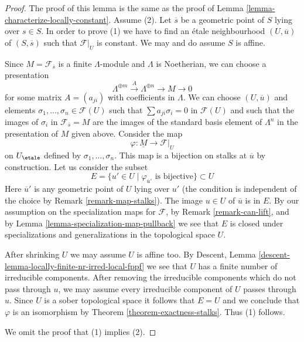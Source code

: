 \begin{proof}
The proof of this lemma is the same as the proof of
Lemma \ref{lemma-characterize-locally-constant}.
Assume (2). Let $\overline{s}$ be a geometric point of $S$ lying over
$s \in S$. In order to prove (1) we have to find an \'etale neighbourhood
$(U, \overline{u})$ of $(S, \overline{s})$ such that $\mathcal{F}|_U$
is constant. We may and do assume $S$ is affine.

\medskip\noindent
Since $M = \mathcal{F}_{\overline{s}}$ is a finite $\Lambda$-module
and $\Lambda$ is Noetherian, we can choose a presentation
$$
\Lambda^{\oplus m} \xrightarrow{A} \Lambda^{\oplus n} \to M \to 0
$$
for some matrix $A = (a_{ji})$ with coefficients in $\Lambda$.
We can choose $(U, \overline{u})$ and elements
$\sigma_1, \ldots, \sigma_n \in \mathcal{F}(U)$
such that $\sum a_{ji}\sigma_i = 0$ in $\mathcal{F}(U)$ and
such that the images of $\sigma_i$ in $\mathcal{F}_{\overline{s}} = M$
are the images of the standard basis element of
$\Lambda^n$ in the presentation of $M$ given above.
Consider the map
$$
\varphi : \underline{M} \longrightarrow \mathcal{F}|_U
$$
on $U_\etale$ defined by $\sigma_1, \ldots, \sigma_n$.
This map is a bijection on stalks at $\overline{u}$
by construction. Let us consider the subset
$$
E = \{u' \in U \mid \varphi_{\overline{u}'}\text{ is bijective}\} \subset U
$$
Here $\overline{u}'$ is any geometric point of $U$ lying over $u'$
(the condition is independent of the choice by Remark \ref{remark-map-stalks}).
The image $u \in U$ of $\overline{u}$ is in $E$.
By our assumption on the specialization maps for $\mathcal{F}$,
by Remark \ref{remark-can-lift}, and by
Lemma \ref{lemma-specialization-map-pullback}
we see that $E$ is closed under specializations
and generalizations in the topological space $U$.

\medskip\noindent
After shrinking $U$ we may assume $U$ is affine too. By
Descent, Lemma \ref{descent-lemma-locally-finite-nr-irred-local-fppf}
we see that $U$ has a finite number of irreducible components.
After removing the irreducible components which do not pass
through $u$, we may assume every irreducible component of $U$
passes through $u$. Since $U$ is a sober topological space
it follows that $E = U$ and we conclude that $\varphi$ is an isomorphism by
Theorem \ref{theorem-exactness-stalks}. Thus (1) follows.

\medskip\noindent
We omit the proof that (1) implies (2).
\end{proof}

